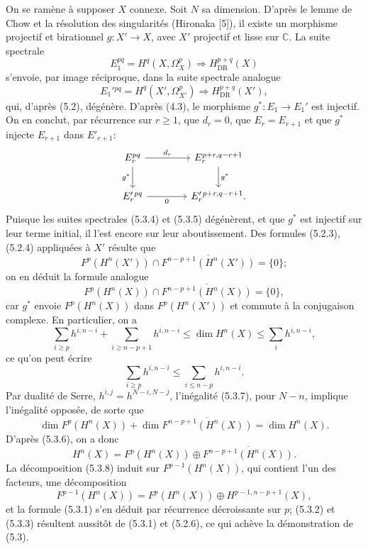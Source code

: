 \documentclass[10pt]{article}
\providecommand{\C}{\mathbb C}
\providecommand{\DR}{\operatorname{DR}}
\begin{document}
On se ramène à supposer $X$ connexe. Soit $N$ sa dimension. D'après le lemme de Chow et la résolution des singularités (Hironaka [5]), il existe un morphisme projectif et birationnel $g:X'\to X$, avec $X'$ projectif et lisse sur $\C$. La suite spectrale
\[
\tag{5.3.4}
E_1^{pq}=H^q(X,\Omega_X^p)\Longrightarrow H_{\DR}^{p+q}(X)
\]
s'envoie, par image réciproque, dans la suite spectrale analogue
\[
\tag{5.3.5}
E_1'{}^{pq}=H^q(X',\Omega_{X'}^p)\Longrightarrow H_{\DR}^{p+q}(X'),
\]
qui, d'après (5.2), dégénère. D'après (4.3), le morphisme $g^*:E_1\to E_1'$ est injectif. On en conclut, par récurrence sur $r\ge1$, que $d_r=0$, que $E_r=E_{r+1}$ et que $g^*$ injecte $E_{r+1}$ dans $E'_{r+1}$:
\[
\begin{tikzcd}[column sep=4.0em,row sep=2.1em]
E_r^{pq} \arrow[r,"d_r"] \arrow[d,"g^*"'] & E_r^{p+r,q-r+1} \arrow[d,"g^*"]\\
E_r'{}^{pq} \arrow[r,"0"'] & E_r'{}^{p+r,q-r+1} .
\end{tikzcd}
\]
Puisque les suites spectrales (5.3.4) et (5.3.5) dégénèrent, et que $g^*$ est injectif sur leur terme initial, il l'est encore sur leur aboutissement. Des formules (5.2.3), (5.2.4) appliquées à $X'$ résulte que
\[
F^p(H^n(X'))\cap\overline{F^{n-p+1}(H^n(X'))}=\{0\};
\]
on en déduit la formule analogue
\[
\tag{5.3.6}
F^p(H^n(X))\cap\overline{F^{n-p+1}(H^n(X))}=\{0\},
\]
car $g^*$ envoie $F^p(H^n(X))$ dans $F^p(H^n(X'))$ et commute à la conjugaison complexe. En particulier, on a
\[
\sum_{i\ge p}h^{i,n-i}+\sum_{i\ge n-p+1}h^{i,n-i}\le \dim H^n(X)\le \sum_i h^{i,n-i},
\]
ce qu'on peut écrire
\[
\tag{5.3.7}
\sum_{i\ge p}h^{i,n-i}\le\sum_{i\le n-p}h^{i,n-i}.
\]
Par dualité de Serre, $h^{i,j}=h^{N-i,N-j}$, l'inégalité (5.3.7), pour $N-n$, implique l'inégalité opposée, de sorte que
\[
\dim F^p(H^n(X))+\dim \overline{F^{n-p+1}(H^n(X))}=\dim H^n(X).
\]
D'après (5.3.6), on a donc
\[
\tag{5.3.8}
H^n(X)=F^p(H^n(X))\oplus\overline{F^{n-p+1}(H^n(X))}.
\]
La décomposition (5.3.8) induit sur $F^{p-1}(H^n(X))$, qui contient l'un des facteurs, une décomposition
\[
F^{p-1}(H^n(X))=F^p(H^n(X))\oplus H^{p-1,n-p+1}(X),
\]
et la formule (5.3.1) s'en déduit par récurrence décroissante sur $p$; (5.3.2) et (5.3.3) résultent aussitôt de (5.3.1) et (5.2.6), ce qui achève la démonstration de (5.3).
\end{document}
